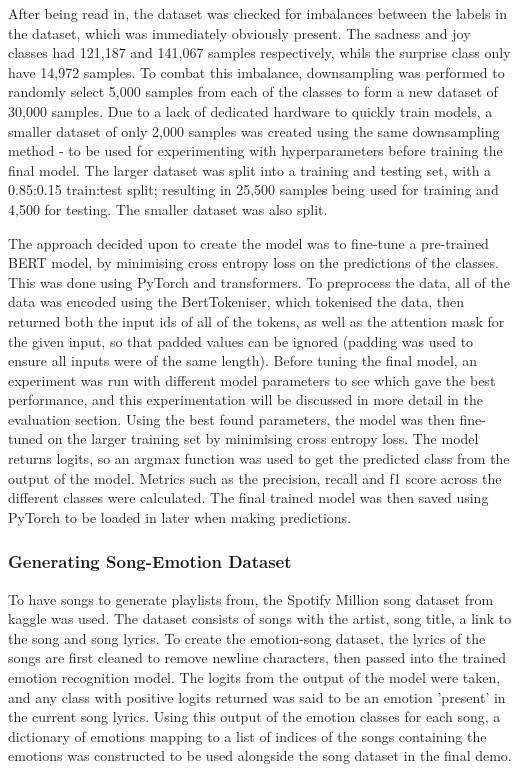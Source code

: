 \documentclass[11pt]{article}
\begin{document}
After being read in, the dataset was checked for imbalances between the labels in the dataset, which was immediately obviously present. The sadness and joy classes had 121,187 and 141,067 samples respectively, whils the surprise class only have 14,972 samples. To combat this imbalance, downsampling was performed to randomly select 5,000 samples from each of the classes to form a new dataset of 30,000 samples. Due to a lack of dedicated hardware to quickly train models, a smaller dataset of only 2,000 samples was created using the same downsampling method - to be used for experimenting with hyperparameters before training the final model. The larger dataset was split into a training and testing set, with a 0.85:0.15 train:test split; resulting in 25,500 samples being used for training and 4,500 for testing. The smaller dataset was also split.

The approach decided upon to create the model was to fine-tune a pre-trained BERT \cite{bert} model, by minimising cross entropy loss on the predictions of the classes. This was done using PyTorch and transformers. To preprocess the data, all of the data was encoded using the BertTokeniser, which tokenised the data, then returned both the input ids of all of the tokens, as well as the attention mask for the given input, so that padded values can be ignored (padding was used to ensure all inputs were of the same length). Before tuning the final model, an experiment was run with different model parameters to see which gave the best performance, and this experimentation will be discussed in more detail in the evaluation section. Using the best found parameters, the model was then fine-tuned on the larger training set by minimising cross entropy loss. The model returns logits, so an argmax function was used to get the predicted class from the output of the model. Metrics such as the precision, recall and f1 score across the different classes were calculated. The final trained model was then saved using PyTorch to be loaded in later when making predictions.

\subsubsection{Generating Song-Emotion Dataset}
To have songs to generate playlists from, the Spotify Million song dataset \cite{spotify} from kaggle was used. The dataset consists of songs with the artist, song title, a link to the song and song lyrics. To create the emotion-song dataset, the lyrics of the songs are first cleaned to remove newline characters, then passed into the trained emotion recognition model. The logits from the output of the model were taken, and any class with positive logits returned was said to be an emotion 'present' in the current song lyrics. Using this output of the emotion classes for each song, a dictionary of emotions mapping to a list of indices of the songs containing the emotions was constructed to be used alongside the song dataset in the final demo.
\end{document}
